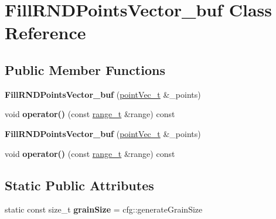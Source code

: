\hypertarget{classFillRNDPointsVector__buf}{}\section{Fill\+R\+N\+D\+Points\+Vector\+\_\+buf Class Reference}
\label{classFillRNDPointsVector__buf}
\subsection*{Public Member Functions}
\begin{DoxyCompactItemize}
\item 
\hypertarget{classFillRNDPointsVector__buf_a2a587860fd1ca16c52f78738d72dd5a8}{}{\bfseries Fill\+R\+N\+D\+Points\+Vector\+\_\+buf} (\hyperlink{classtbb_1_1concurrent__vector}{point\+Vec\+\_\+t} \&\+\_\+points)\label{classFillRNDPointsVector__buf_a2a587860fd1ca16c52f78738d72dd5a8}

\item 
\hypertarget{classFillRNDPointsVector__buf_a8cb3d9b37f8e891b37ff9fc96d5b938f}{}void {\bfseries operator()} (const \hyperlink{classtbb_1_1blocked__range}{range\+\_\+t} \&range) const \label{classFillRNDPointsVector__buf_a8cb3d9b37f8e891b37ff9fc96d5b938f}

\item 
\hypertarget{classFillRNDPointsVector__buf_a2a587860fd1ca16c52f78738d72dd5a8}{}{\bfseries Fill\+R\+N\+D\+Points\+Vector\+\_\+buf} (\hyperlink{classtbb_1_1concurrent__vector}{point\+Vec\+\_\+t} \&\+\_\+points)\label{classFillRNDPointsVector__buf_a2a587860fd1ca16c52f78738d72dd5a8}

\item 
\hypertarget{classFillRNDPointsVector__buf_a8cb3d9b37f8e891b37ff9fc96d5b938f}{}void {\bfseries operator()} (const \hyperlink{classtbb_1_1blocked__range}{range\+\_\+t} \&range) const \label{classFillRNDPointsVector__buf_a8cb3d9b37f8e891b37ff9fc96d5b938f}

\end{DoxyCompactItemize}
\subsection*{Static Public Attributes}
\begin{DoxyCompactItemize}
\item 
\hypertarget{classFillRNDPointsVector__buf_a9ece94d331eb04b395bd1f6000402bd3}{}static const size\+\_\+t {\bfseries grain\+Size} = cfg\+::generate\+Grain\+Size\label{classFillRNDPointsVector__buf_a9ece94d331eb04b395bd1f6000402bd3}

\end{DoxyCompactItemize}


